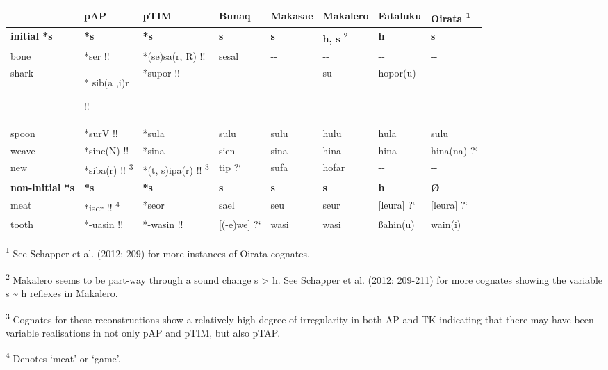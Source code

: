 \begin{center}
\tablehead{}
\begin{supertabular}{m{0.9677598in}m{0.9406598in}m{0.9004598in}m{0.63935983in}m{0.66775984in}m{0.7052598in}m{0.8316598in}m{0.65735984in}}
\hline
 &
pAP &
pTIM &
Bunaq &
Makasae &
Makalero &
Fataluku &
Oirata \textsuperscript{1}\\\hline
\textbf{initial *s} &
\textbf{*s} &
\textbf{*s} &
\textbf{s} &
\textbf{s} &
\textbf{h, s }\textsuperscript{2} &
\textbf{h} &
\textbf{s }\\\hline
bone &
*ser !! &
*(se)sa(r, R) !! &
sesal &
{}-{}- &
{}-{}- &
{}-{}- &
{}-{}-\\
shark &
* sib(a ,i)r

!! &
*supor !! &
{}-{}- &
{}-{}- &
su- &
hopor(u) &
{}-{}-\\
spoon &
*surV !! &
*sula &
sulu  &
sulu  &
hulu  &
hula  &
sulu \\
weave &
*sine(N) !! &
*sina &
sien  &
sina  &
hina  &
hina  &
hina(na) ?`\\
new  &
*siba(r) !! \textsuperscript{3} &
*(t, s)ipa(r) !! \textsuperscript{3} &
tip ?` &
sufa &
hofar &
{}-{}- &
{}-{}-\\\hline
\textbf{non-initial *s} &
\textbf{*s} &
\textbf{*s} &
\textbf{s} &
\textbf{s} &
\textbf{s} &
\textbf{h} &
\textbf{{\O}}\\\hline
meat &
*iser !! \textsuperscript{4} &
*seor &
sael &
seu &
seur &
[leura] ?` &
[leura] ?`\\
tooth\ \  &
*-uasin !!  &
*-wasin !! &
[(-e)we] ?` &
wasi &
wasi &
{\ss}ahin(u) &
wain(i)\\\hline
\end{supertabular}
\end{center}
\textsuperscript{1 }See Schapper et al. (2012: 209) for more instances of Oirata cognates.

\textsuperscript{2}\textbf{ }Makalero seems to be part-way through a sound change s {\textgreater} h. See Schapper et al. (2012: 209-211) for more cognates showing the variable s \~{} h reflexes in Makalero. 

\textsuperscript{3} Cognates for these reconstructions show a relatively high degree of irregularity in both AP and TK indicating that there may have been variable realisations in not only pAP and pTIM, but also pTAP.

\textsuperscript{4} Denotes {\textquoteleft}meat{\textquoteright} or {\textquoteleft}game{\textquoteright}.

